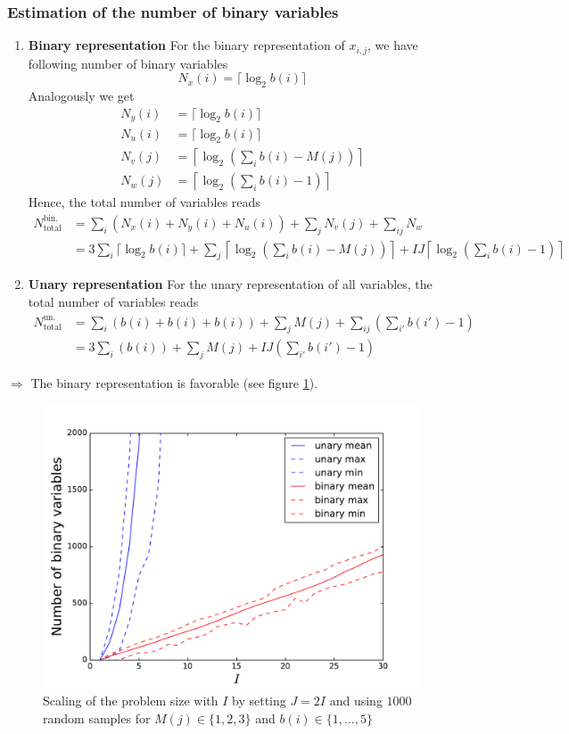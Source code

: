 \documentclass{article}
\begin{document}
\subsubsection{Estimation of the number of binary variables}
\begin{enumerate}
    \item \textbf{Binary representation}
    For the binary representation of $x_{i, j}$, we have following number of binary variables
    \begin{equation*}
        N_x(i) = \lceil \log_2 b(i) \rceil 
    \end{equation*}
    Analogously we get 
    \begin{align*}
        N_y(i) &= \lceil \log_2 b(i) \rceil \\
        N_u(i) &= \lceil \log_2 b(i) \rceil \\
        N_v(j) &= \left \lceil \log_2 \left( \sum_i b(i) - M(j) \right) \right \rceil  \\
        N_w(j) &= \left \lceil \log_2\left(\sum_i b(i) - 1\right) \right \rceil 
    \end{align*}
    Hence, the total number of variables reads
    \begin{align*}
        N_\text{total}^\text{bin. rep.} & = \sum_i \left( N_x(i) + N_y(i) + N_u(i) \right) + \sum_j N_v(j) + \sum_{ij} N_w \\
                                        & = 3 \sum_i \lceil \log_2 b(i) \rceil + \sum_j \left \lceil \log_2 \left(\sum_i b(i) - M(j)\right) \right \rceil+ I J \left \lceil \log_2 \left( \sum_i b(i) - 1 \right) \right \rceil 
    \end{align*}
    \item \textbf{Unary representation}
    For the unary representation of all variables, the total number of variables reads
    \begin{align*}
        N_\text{total}^\text{un. rep.} & = \sum_i \left( b(i) + b(i) + b(i)\right) + \sum_j M(j) + \sum_{ij} \left(\sum_{i'} b(i') - 1\right) \\
                                       & = 3 \sum_i \left(b(i)\right) + \sum_j M(j) + I J \left(\sum_{i'} b(i') - 1\right)
    \end{align*}
\end{enumerate}
$\Rightarrow$ The binary representation is favorable (see figure \ref{fig:problem_size}).
\begin{figure}[htpb]
    \centering
    \includegraphics[width=0.6\linewidth]{pics/problem_size}
    \caption{Scaling of the problem size with $I$ by setting $J=2I$ and using $1000$ random samples for $M(j)\in\{1,2,3\}$ and $b(i)\in\{1,\dots, 5\}$}
    \label{fig:problem_size}
\end{figure}
\end{document}
